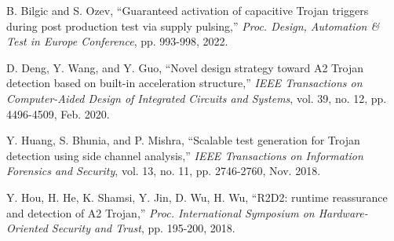 \documentclass[10pt,journal, compsoc]{IEEEtran}
\begin{document}
\begin{thebibliography}{99}
B. Bilgic and S. Ozev, ``Guaranteed activation of capacitive Trojan triggers during post production test via supply pulsing,'' \textit{Proc. Design, Automation \& Test in Europe Conference}, pp. 993-998, 2022.


D. Deng, Y. Wang, and Y. Guo, ``Novel design strategy toward A2 Trojan detection based on built-in acceleration structure,'' \textit{IEEE Transactions on Computer-Aided Design of Integrated Circuits and Systems}, vol. 39, no. 12, pp. 4496-4509, Feb. 2020.

Y. Huang, S. Bhunia, and P. Mishra, ``Scalable test generation for Trojan detection using side channel analysis,'' \textit{IEEE Transactions on Information Forensics and Security}, vol. 13, no. 11, pp. 2746-2760, Nov. 2018.







Y. Hou, H. He, K. Shamsi, Y. Jin, D. Wu, H. Wu, ``R2D2: runtime reassurance and detection of A2 Trojan,'' \textit{Proc. International Symposium on Hardware-Oriented Security and Trust}, pp. 195-200, 2018.






\end{thebibliography}
\end{document}
